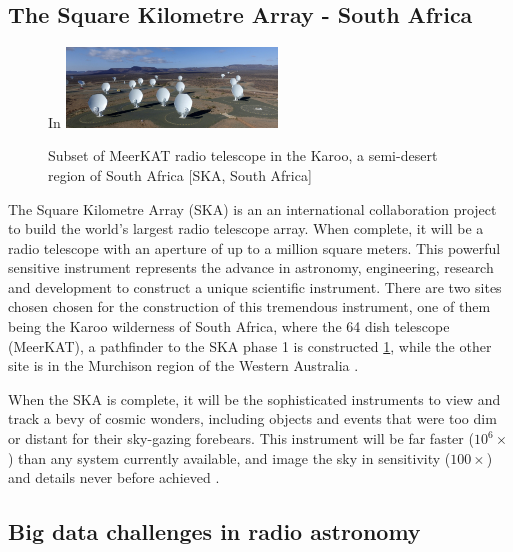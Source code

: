 \subsection{The Square Kilometre Array - South Africa}

\begin{figure}[H]In
  \centering
    \includegraphics[width=0.5\textwidth]{images/MeerMeer.jpg}
    \caption{Subset of MeerKAT radio telescope in the Karoo, a semi-desert region of South Africa [SKA, South Africa]}
  \label{images/MeerKAT}
\end{figure}

The Square Kilometre Array (SKA) is an an international collaboration project to build the world's largest radio telescope array. When complete, it will be a radio telescope with an aperture of up to a million square meters. This powerful sensitive instrument represents the advance in astronomy, engineering, research and  development to construct a unique scientific instrument. There are two sites chosen chosen for the construction of this tremendous instrument, one of them being the Karoo wilderness of South Africa, where the 64 dish telescope (MeerKAT), a pathfinder to the SKA phase 1 is constructed \ref{images/MeerKAT}, while the other site is in the Murchison region of the Western Australia \citep{hall2008square}.  

When the SKA is complete, it will be the sophisticated instruments to view and track a bevy of cosmic wonders, including objects and events that were too dim or distant for their sky-gazing forebears. This instrument will be far faster ($10^6\times$) than any system currently available, and image the sky in sensitivity ($100\times$) and details never before achieved \citep{staats2016genetic}.

\subsection{Big data challenges in radio astronomy}

